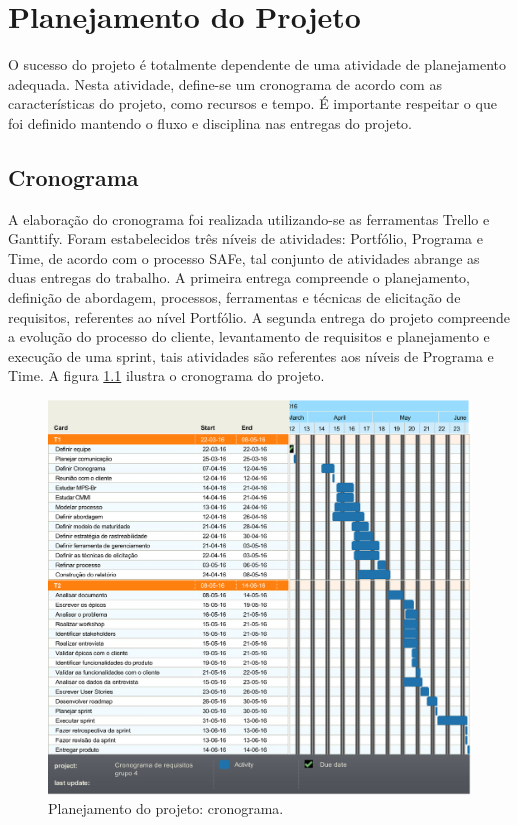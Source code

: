 \chapter[Planejamento do Projeto]{Planejamento do Projeto}

O sucesso do projeto é totalmente dependente de uma atividade de planejamento adequada. Nesta atividade, define-se um cronograma de acordo com as características do projeto, como recursos e tempo. É importante respeitar o que foi definido mantendo o fluxo e disciplina nas entregas do projeto.

\section{Cronograma}

A elaboração do cronograma foi realizada utilizando-se as ferramentas Trello e Ganttify. Foram estabelecidos três níveis de atividades: Portfólio, Programa e Time, de acordo com o processo SAFe, tal conjunto de atividades abrange as duas entregas do trabalho. 
A primeira entrega compreende o planejamento, definição de abordagem, processos, ferramentas e técnicas de elicitação de requisitos, referentes ao nível Portfólio.
A segunda entrega do projeto compreende a evolução do processo do cliente, levantamento de requisitos e planejamento e execução de uma sprint, tais atividades são referentes aos níveis de Programa e Time. A figura \ref{cronograma} ilustra o cronograma do projeto.

\begin{figure}[!htbp]
	\centering
	\includegraphics[width=\textwidth]{figuras/cronograma}
	\caption{Planejamento do projeto: cronograma.}
	\label{cronograma}
\end{figure}
